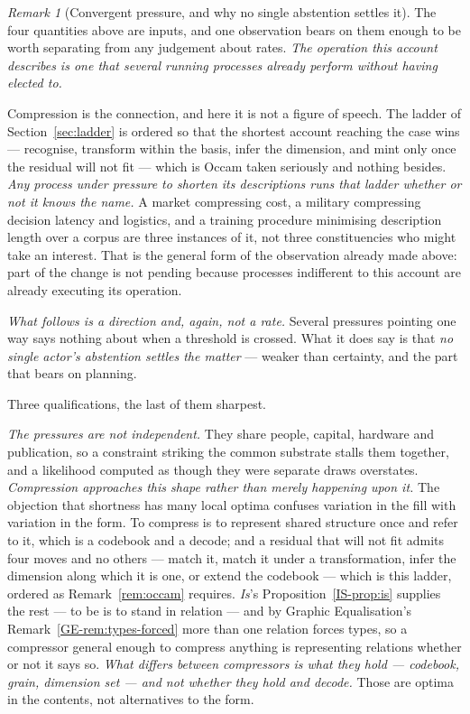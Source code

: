 \documentclass[11pt,a4paper]{article}
\theoremstyle{remark}
\newtheorem{remark}[definition]{Remark}
\begin{document}
\begin{remark}[Convergent pressure, and why no single abstention settles it]\label{rem:convergent}
The four quantities above are inputs, and one observation bears on them enough to be worth separating
from any judgement about rates. \emph{The operation this account describes is one that several running
processes already perform without having elected to.}

Compression is the connection, and here it is not a figure of speech. The ladder of
Section~\ref{sec:ladder} is ordered so that the shortest account reaching the case wins --- recognise,
transform within the basis, infer the dimension, and mint only once the residual will not fit --- which
is Occam taken seriously and nothing besides. \emph{Any process under pressure to shorten its
descriptions runs that ladder whether or not it knows the name.} A market compressing cost, a military
compressing decision latency and logistics, and a training procedure minimising description length over
a corpus are three instances of it, not three constituencies who might take an interest. That is the
general form of the observation already made above: part of the change is not pending because processes
indifferent to this account are already executing its operation.

\emph{What follows is a direction and, again, not a rate.} Several pressures pointing one way says
nothing about when a threshold is crossed. What it does say is that \emph{no single actor's abstention
settles the matter} --- weaker than certainty, and the part that bears on planning.

Three qualifications, the last of them sharpest.

\emph{The pressures are not independent.} They share people, capital, hardware and publication, so a
constraint striking the common substrate stalls them together, and a likelihood computed as though they
were separate draws overstates. \emph{Compression approaches this shape rather than
merely happening upon it.} The objection that shortness has many local optima confuses variation in the
fill with variation in the form. To compress is to represent shared structure once and refer to it,
which is a codebook and a decode; and a residual that will not fit admits four moves and no others ---
match it, match it under a transformation, infer the dimension along which it is one, or extend the
codebook --- which is this ladder, ordered as Remark~\ref{rem:occam} requires. \emph{Is}'s
Proposition~\ref{IS-prop:is} supplies the rest --- to be is to stand in relation --- and by Graphic
Equalisation's Remark~\ref{GE-rem:types-forced} more than one relation forces types, so
a compressor general enough to compress anything is representing relations whether or not it says so.
\emph{What differs between compressors is what they hold --- codebook, grain, dimension set --- and not
whether they hold and decode.} Those are optima in the contents, not alternatives to the form.


\end{remark}
\end{document}
